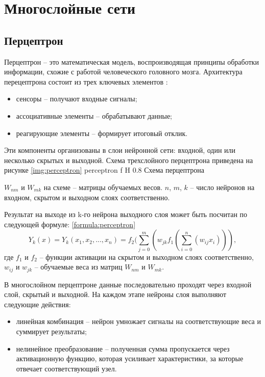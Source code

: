\section{Многослойные сети}
\subsection{Перцептрон}
Перцептрон -- это математическая модель, воспроизводящая принципы обработки информации, схожие с работой человеческого головного мозга. Архитектура перецептрона состоит из трех ключевых элементов \cite{mfetoum2024multilayer}:
\begin{itemize}
	\item сенсоры -- получают входные сигналы;
	\item ассоциативные элементы -- обрабатывают данные;
	\item реагирующие элементы -- формирует итоговый отклик.
\end{itemize}

Эти компоненты организованы в слои нейронной сети: входной, один или несколько скрытых и выходной.
Схема трехслойного перцептрона приведена на рисунке \ref{img:perceptron}
{perceptron} %
{f} %
{H} %
{0.8\textwidth} %
{Схема перцептрона} %

$W_{nm}$ и $W_{mk}$ на схеме -- матрицы обучаемых весов. $n$, $m$, $k$ -- число нейронов на входном, скрытом и выходном слоях соответственно. 

Результат на выходе из k-го нейрона выходного слоя может быть посчитан по следующей формуле: \ref{formula:perceptron}
\begin{equation}\label{formula:perceptron}
	Y_k(x) = Y_k(x_1, x_2, ..., x_n) = f_2(\sum_{j=0}^{m}(w_{jk} f_1(\sum_{i=0}^{n}(w_{ij}x_i))),
\end{equation}
где $f_1$ и $f_2$ -- функции активации на скрытом и выходном слоях соответственно, $w_{ij}$ и $w_{jk}$ -- обучаемые веса из матриц $W_{nm}$ и $W_{mk}$.

В многослойном перцептроне данные последовательно проходят через входной слой, скрытый и выходной.
На каждом этапе нейроны слоя выполняют следующие действия:
\begin{itemize}
	\item линейная комбинация -- нейрон умножает сигналы на соответствующие веса и суммирует результаты;
	\item нелинейное преобразование -- полученная сумма пропускается через активационную функцию, которая усиливает характеристики, за которые отвечает соответствующий узел.
\end{itemize}

